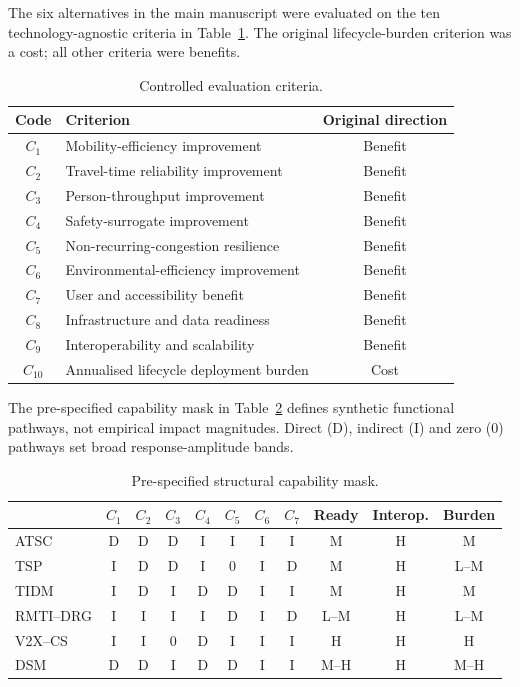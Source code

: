 \documentclass[runningheads]{llncs}
\begin{document}
The six alternatives in the main manuscript were evaluated on the ten technology-agnostic
criteria in Table~\ref{supp:tab:criteria}. The original lifecycle-burden criterion was a cost;
all other criteria were benefits.

\begin{table}[t]
\centering
\caption{Controlled evaluation criteria.}
\label{supp:tab:criteria}
\small
\begin{tabularx}{\linewidth}{@{}c X c@{}}
\toprule
Code & Criterion & Original direction\\
\midrule
$C_1$ & Mobility-efficiency improvement & Benefit\\
$C_2$ & Travel-time reliability improvement & Benefit\\
$C_3$ & Person-throughput improvement & Benefit\\
$C_4$ & Safety-surrogate improvement & Benefit\\
$C_5$ & Non-recurring-congestion resilience & Benefit\\
$C_6$ & Environmental-efficiency improvement & Benefit\\
$C_7$ & User and accessibility benefit & Benefit\\
$C_8$ & Infrastructure and data readiness & Benefit\\
$C_9$ & Interoperability and scalability & Benefit\\
$C_{10}$ & Annualised lifecycle deployment burden & Cost\\
\bottomrule
\end{tabularx}
\end{table}

The pre-specified capability mask in Table~\ref{supp:tab:mask} defines synthetic functional
pathways, not empirical impact magnitudes. Direct (D), indirect (I) and zero (0) pathways set
broad response-amplitude bands.

\begin{table}[t]
\centering
\caption{Pre-specified structural capability mask.}
\label{supp:tab:mask}
\scriptsize
\begin{tabular}{@{}lccccccc ccc@{}}
\toprule
 & $C_1$ & $C_2$ & $C_3$ & $C_4$ & $C_5$ & $C_6$ & $C_7$ & Ready & Interop. & Burden\\
\midrule
ATSC      & D & D & D & I & I & I & I & M    & H & M\\
TSP       & I & D & D & I & 0 & I & D & M    & H & L--M\\
TIDM      & I & D & I & D & D & I & I & M    & H & M\\
RMTI--DRG & I & I & I & I & D & I & D & L--M & H & L--M\\
V2X--CS   & I & I & 0 & D & I & I & I & H    & H & H\\
DSM       & D & D & I & D & D & I & I & M--H & H & M--H\\
\bottomrule
\end{tabular}
\end{table}
\end{document}

